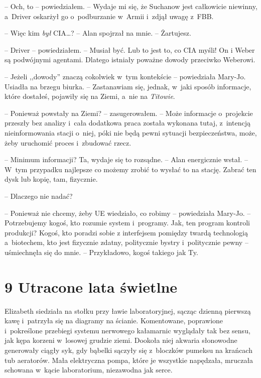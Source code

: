 \documentclass[oneside,polish,12pt,sfheadings]{mwbk}
\begin{document}
-- Och, to -- powiedziałem. -- Wydaje mi się, że Suchanow jest całkowicie
niewinny, a~Driver oskarżył go o~podburzanie w~Armii i~zdjął uwagę z~FBB.

-- Więc kim \emph{był} CIA\ldots? -- Alan spojrzał na mnie. -- Żartujesz.

-- Driver -- powiedziałem. -- Musiał być. Lub to jest to, co CIA myśli! On
i Weber są podwójnymi agentami. Dlatego istniały poważne dowody
przeciwko Weberowi.

-- Jeżeli ,,dowody'' znaczą cokolwiek w~tym kontekście -- powiedziała
Mary-Jo. Usiadła na brzegu biurka. -- Zastanawiam się, jednak, w~jaki
sposób informacje, które dostałeś, pojawiły się na Ziemi, a~nie na
\emph{Titowie}.

-- Ponieważ powstały na Ziemi? -- zasugerowałem. -- Może informacje o~projekcie przeszły bez analizy i~cała dodatkowa praca została wykonana
tutaj, z~intencją nieinformowania stacji o~niej, póki nie będą pewni
sytuacji bezpieczeństwa, może, żeby uruchomić proces i~zbudować rzecz.

-- Minimum informacji? Ta, wydaje się to rozsądne. -- Alan energicznie
wstał. -- W~tym przypadku najlepsze co możemy zrobić to wysłać to na
stację. Zabrać ten dysk lub kopię, tam, fizycznie.

-- Dlaczego nie nadać?

-- Ponieważ nie chcemy, żeby UE wiedziało, co robimy -- powiedziała Mary-Jo. -- Potrzebujemy kogoś, kto rozumie system i~programy. Jak, ten program kontroli produkcji? Kogoś, kto poradzi sobie
z interfejsem pomiędzy twardą technologią a~biotechem, kto jest
fizycznie zdatny, politycznie bystry i~politycznie pewny -- uśmiechnęła
się do mnie. -- Przykładowo, kogoś takiego jak Ty.
 

\chapter[Utracone lata świetlne]{9 Utracone lata świetlne}


Elizabeth siedziała na stołku przy ławie laboratoryjnej, sącząc dzienną
pierwszą kawę i~patrzyła się na diagramy na ścianie. Komentowane,
poprawione i~pokreślone przebiegi systemu nerwowego kałamarnic wyglądały
tak bez sensu, jak kępa korzeni w~losowej grudzie ziemi. Dookoła niej
akwaria słonowodne generowały ciągły syk, gdy bąbelki sączyły się z~bloczków pumeksu na krańcach tub aeratorów. Mała elektryczna pompa,
które je wszystkie napędzała, mruczała schowana w~kącie laboratorium,
niezawodna jak serce.
\end{document}
